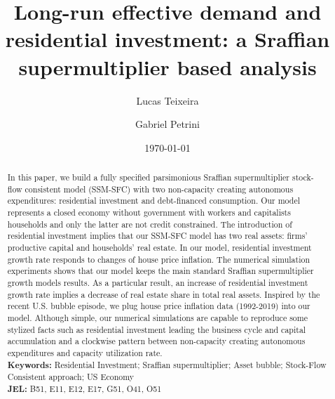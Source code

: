 \documentclass[12pt, a4]{article}
\author[1]{Lucas Teixeira}
\affil[1]{Assistent Professor at University of Campinas (Brazil), Email: \url{lucastei@unicamp.br}} %
\author[2]{Gabriel Petrini}
\affil[2]{PhD Student at University of Campinas (Brazil), Email: \url{gpetrinidasilveira@gmail.com}} %
\date{\today}
\title{Long-run effective demand and residential investment: a Sraffian supermultiplier based analysis}
\begin{document}
\maketitle
\begin{abstract}
In this paper, we build a fully specified parsimonious Sraffian supermultiplier stock-flow consistent model (SSM-SFC) with two non-capacity creating autonomous expenditures: residential investment and debt-financed consumption.
Our model represents a closed economy without government with workers and capitalists households and only the latter are not credit constrained.
The introduction of residential investment implies that our SSM-SFC model has two real assets: firms' productive capital and households' real estate.
In our model, residential investment growth rate responds to changes of house price inflation.
The numerical simulation experiments shows that our model keeps the main standard Sraffian supermultiplier growth models results.
As a particular result, an increase of residential investment growth rate implies a decrease of real estate share in total real assets.
Inspired by the recent U.S. bubble episode, we plug house price inflation data (1992-2019) into our model.
Although simple, our numerical simulations are capable to reproduce some stylized facts such as residential investment leading the business cycle and capital accumulation and a clockwise pattern between non-capacity creating autonomous expenditures and capacity utilization rate.\\

\noindent \textbf{Keywords:} Residential Investment; Sraffian supermultiplier; Asset bubble;  Stock-Flow Consistent approach; US Economy\\
\noindent \textbf{JEL:} B51, E11, E12, E17, G51, O41, O51
\end{abstract}
\end{document}
